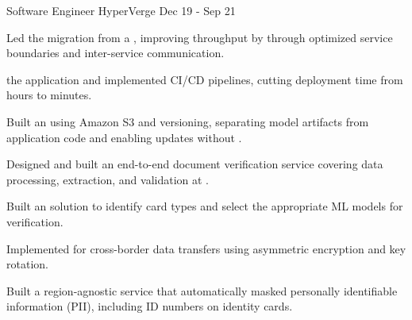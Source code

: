 \begin{cventries}
  \cventry
    {Software Engineer}
    {HyperVerge}
    {Dec 19 - Sep 21}
    {}
    {
      \begin{cvitems}
        \item {Led the migration from a , improving throughput by  through optimized service boundaries and inter-service communication.}
        \item { the application and implemented CI/CD pipelines, cutting deployment time from hours to minutes.}
        \item {Built an  using Amazon S3 and versioning,
          separating model artifacts from application code and enabling updates without .}
        \item {Designed and built an end-to-end document verification service covering data processing, extraction, and validation at .}
        \item {Built an  solution to identify card types and select the appropriate ML models for verification.}
        \item {Implemented  for cross-border data transfers using asymmetric encryption and key rotation.}
        \item {Built a region-agnostic service that automatically masked personally identifiable information (PII), including ID numbers on identity cards.}
      \end{cvitems}
    }

\end{cventries}

